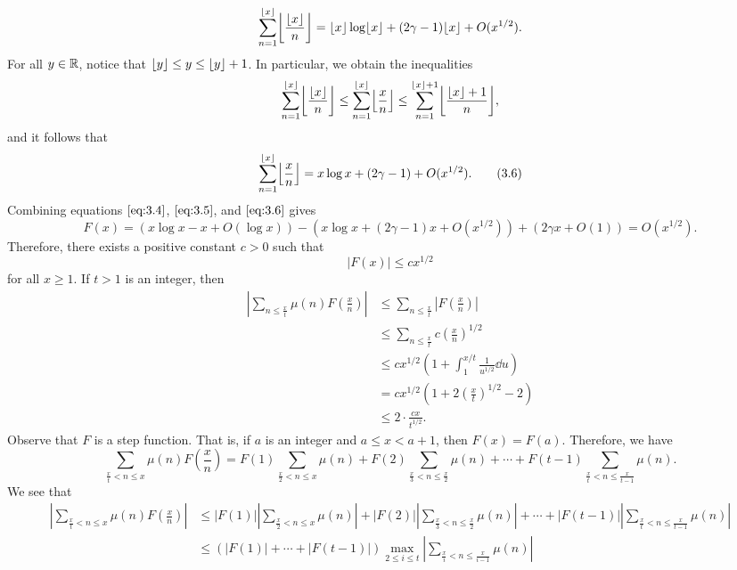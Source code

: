 \begin{pf}
    \[ \sum_{n=1}^{\floor{x}} \floor*{\frac{\floor x}n} = \floor{x}\log\floor{x} 
    + (2\gamma - 1)\floor{x} + O(x^{1/2}). \] 
    For all $y \in \mathbb{R}$, notice that $\lfloor y\rfloor \leq y \leq \lfloor y\rfloor+1$. In particular, 
    we obtain the inequalities 
    \[ \sum_{n=1}^{\floor{x}} \floor*{\frac{\floor{x}}n} \leq 
    \sum_{n=1}^{\floor{x}} \floor*{\frac{x}n} \leq 
    \sum_{n=1}^{\floor{x}+1} \floor*{\frac{\floor{x}+1}n}, \] 
    and it follows that 
    \[ \sum_{n=1}^{\floor{x}} \floor*{\frac{x}{n}} = x\log x + (2\gamma - 1) 
    + O(x^{1/2}). \tag{3.6}\label{eq:3.6} \] 
    Combining equations $\eqref{eq:3.4}$, $\eqref{eq:3.5}$, and $\eqref{eq:3.6}$ gives 
    \[ F(x) = (x\log x - x + O(\log x)) - (x\log x + (2\gamma-1)x + O(x^{1/2})) 
    + (2\gamma x + O(1)) = O(x^{1/2}). \] 
    Therefore, there exists a positive constant $c > 0$ such that 
    \[ |F(x)| \leq cx^{1/2} \] 
    for all $x \geq 1$. If $t > 1$ is an integer, then 
    \begin{align*}
        \left| \sum_{n\leq \frac xt} \mu(n) F\left( \frac xn \right) \right| 
        &\leq \sum_{n\leq \frac xt} \left| F\left( \frac xn \right) \right| \\ 
        &\leq \sum_{n\leq \frac xt} c\left( \frac xn \right)^{\!1/2} \\
        &\leq cx^{1/2} \left( 1 + \int_1^{x/t} \frac{1}{u^{1/2}}\dd u \right) \\
        &= cx^{1/2} \left(1 + 2 \left( \frac xt \right)^{\!1/2} - 2 \right) \\ 
        &\leq 2 \cdot \frac{cx}{t^{1/2}}. \tag{3.7}\label{eq:3.7}
    \end{align*}
    Observe that $F$ is a step function. That is, if $a$ is an integer and 
    $a \leq x < a + 1$, then $F(x) = F(a)$. Therefore, we have 
    \[ \sum_{\frac xt < n \leq x} \mu(n) F\left(\frac xn \right) 
    = F(1) \sum_{\frac x2 < n \leq x} \mu(n) + F(2) \sum_{\frac x3 < n \leq 
    \frac x2} \mu(n) + \cdots + F(t-1) \sum_{\frac xt < n \leq \frac{x}{t-1}} \mu(n). \] 
    We see that 
    \begin{align*}
        \left| \sum_{\frac xt < n \leq x} \mu(n) F\left(\frac xn \right) \right| 
        &\leq |F(1)| \left| \sum_{\frac x2 < n \leq x} \mu(n) \right| + 
        |F(2)| \left| \sum_{\frac x3 < n \leq \frac x2} \mu(n) \right| + \cdots + 
        |F(t-1)| \left| \sum_{\frac xt < n \leq \frac{x}{t-1}} \mu(n) \right| \\ 
        &\leq (|F(1)| + \cdots + |F(t-1)|) \max_{2\leq i \leq t} 
        \left| \sum_{\frac xi < n \leq \frac{x}{i-1}} \mu(n) \right| \\ 

\end{align*}
\end{pf}
